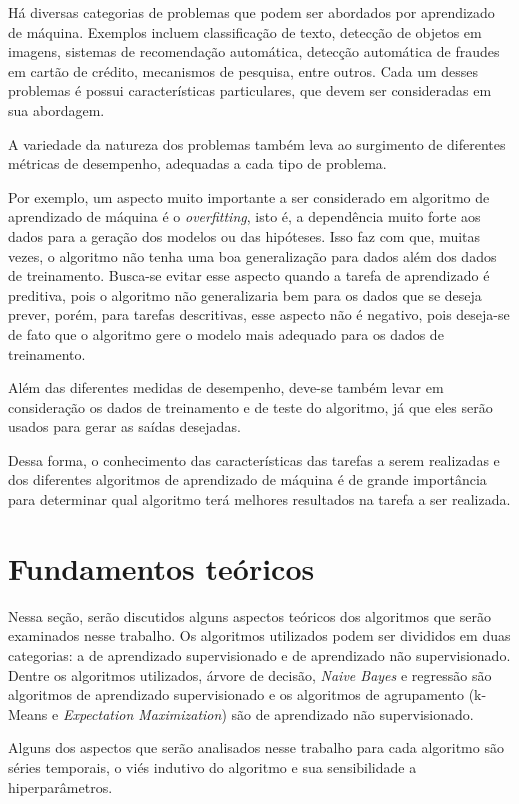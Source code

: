 \documentclass{article}
\begin{document}
Há diversas categorias de problemas que podem ser abordados por aprendizado de máquina.
Exemplos incluem classificação de texto, detecção de objetos em imagens,
sistemas de recomendação automática, detecção automática de fraudes em cartão de crédito,
mecanismos de pesquisa, entre outros.
Cada um desses problemas é possui características particulares,
que devem ser consideradas em sua abordagem.

A variedade da natureza dos problemas também leva ao surgimento de diferentes métricas de desempenho, adequadas a cada tipo de problema.

Por exemplo, um aspecto muito importante a ser considerado em algoritmo de aprendizado de máquina é o {\it overfitting},
isto é, a dependência muito forte aos dados para a geração dos modelos ou das hipóteses.
Isso faz com que, muitas vezes, o algoritmo não tenha uma boa generalização para dados além dos dados de treinamento.
Busca-se evitar esse aspecto quando a tarefa de aprendizado é preditiva,
pois o algoritmo não generalizaria bem para os dados que se deseja prever,
porém, para tarefas descritivas, esse aspecto não é negativo,
pois deseja-se de fato que o algoritmo gere o modelo mais adequado para os dados de treinamento.

Além das diferentes medidas de desempenho, deve-se também levar em consideração os dados de treinamento e de teste do algoritmo,
já que eles serão usados para gerar as saídas desejadas.

Dessa forma, o conhecimento das características das tarefas a serem realizadas e dos diferentes algoritmos de aprendizado de máquina é de grande importância para determinar qual algoritmo terá melhores resultados na tarefa a ser realizada.

\section{Fundamentos teóricos}

Nessa seção, serão discutidos alguns aspectos teóricos dos algoritmos que serão examinados nesse trabalho.
Os algoritmos utilizados podem ser divididos em duas categorias: a de aprendizado supervisionado e de aprendizado não supervisionado.
Dentre os algoritmos utilizados, árvore de decisão, {\it Naive Bayes} e regressão são algoritmos de aprendizado supervisionado e os algoritmos de agrupamento (k-Means e {\it Expectation Maximization}) são de aprendizado não supervisionado.

Alguns dos aspectos que serão analisados nesse trabalho para cada algoritmo são séries temporais, o viés indutivo do algoritmo e sua sensibilidade a hiperparâmetros.
\end{document}
